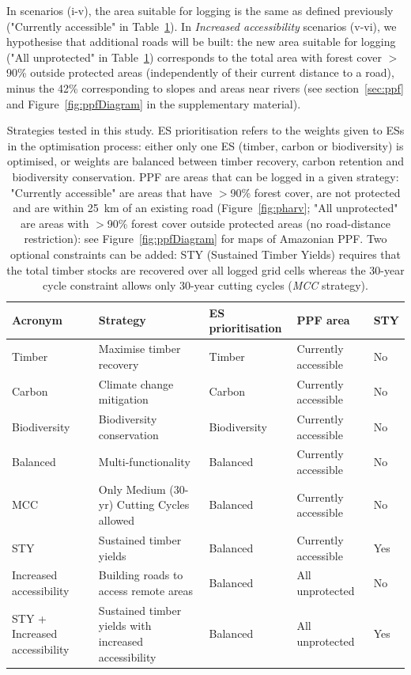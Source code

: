 \documentclass[12pt]{article}
\begin{document}
In scenarios (i-v), the area suitable for logging is the same as defined previously ("Currently accessible" in Table~\ref{tab:strategies}). In \textit{Increased accessibility} scenarios (v-vi), we hypothesise that additional roads will be built: the new area suitable for logging ("All unprotected" in Table~\ref{tab:strategies}) corresponds to the total area with forest cover $>$90\% outside protected areas (independently of their current distance to a road), minus the 42\% corresponding to slopes and areas near rivers (see section~\ref{sec:ppf} and Figure~\ref{fig:ppfDiagram} in the supplementary material). 

\begin{table}
    \centering
    \begin{tabularx}{\textwidth}{p{2.5cm} p{5cm} p{2cm} p{4cm} p{0.8cm}}
    \toprule
         Acronym & Strategy & ES prioritisation & PPF area &  STY \\
         \midrule
         Timber & Maximise timber recovery & Timber  & Currently accessible & No \\
         Carbon & Climate change mitigation &  Carbon & Currently accessible & No \\
         Biodiversity & Biodiversity conservation &  Biodiversity & Currently accessible & No  \\
         Balanced & Multi-functionality & Balanced & Currently accessible & No \\
         MCC & Only Medium (30-yr) Cutting Cycles allowed & Balanced & Currently accessible & No \\
         STY & Sustained timber yields & Balanced & Currently accessible & Yes \\
         Increased accessibility & Building roads to access remote areas & Balanced & All unprotected & No  \\
         STY + Increased accessibility & Sustained timber yields with increased accessibility & Balanced & All unprotected & Yes \\
         \bottomrule
    \end{tabularx}
    \caption{Strategies tested in this study. ES prioritisation refers to the weights given to ESs in the optimisation process: either only one ES (timber, carbon or biodiversity) is optimised, or weights are balanced between timber recovery, carbon retention and biodiversity conservation. PPF are areas that can be logged in a given strategy: "Currently accessible" are areas that have $>$90\% forest cover, are not protected and are within 25~km of an existing road (Figure~\ref{fig:pharv}; "All unprotected" are areas with $>$90\% forest cover outside protected areas (no road-distance restriction): see Figure~\ref{fig:ppfDiagram} for maps of Amazonian PPF. Two optional constraints can be added: STY (Sustained Timber Yields) requires that the total timber stocks are recovered over all logged grid cells whereas the 30-year cycle constraint allows only 30-year cutting cycles (\textit{MCC} strategy).}
    \label{tab:strategies}
\end{table}
\end{document}
